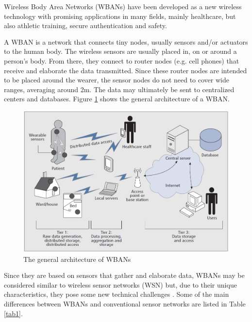 \documentclass[conference]{IEEEtran}
\begin{document}
Wireless Body Area Networks (WBANs) have been developed as a new wireless technology with promising applications in many fields, mainly healthcare, but also athletic training, secure authentication and safety.

A WBAN is a network that connects tiny nodes, usually sensors and/or actuators to the human body. The wireless sensors are usually placed in, on or around a person's body. From there, they connect to router nodes (e.g. cell phones) that receive and elaborate the data transmitted. Since these router nodes are intended to be placed around the wearer, the sensor nodes do not need to cover wide ranges, averaging around 2m. The data may ultimately be sent to centralized centers and databases. Figure \ref{fig_WBAN_arch} shows the general architecture of a WBAN.

\begin{figure}[htbp]
\centering
\includegraphics[width=0.9\linewidth]{img/WBAN_arch.png}
\caption{The general architecture of WBANs}
\label{fig_WBAN_arch}
\end{figure}

Since they are based on sensors that gather and elaborate data, WBANs may be considered similar to wireless sensor networks (WSN) but, due to their unique characteristics, they pose some new technical challenges \cite{cao2009enabling}. Some of the main differences between WBANs and conventional sensor networks are listed in Table \ref{tab1}.
\end{document}
